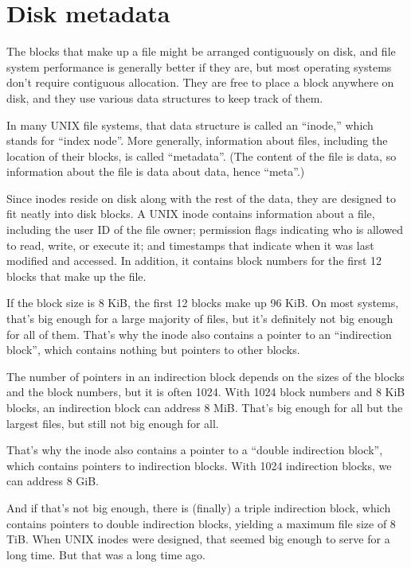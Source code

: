 \documentclass[12pt]{book}
\begin{document}
{\section{Disk metadata}

The blocks that make up a file might be arranged contiguously on
disk, and file system performance is generally better if they are,
but most operating systems don't require contiguous allocation.
They are free to place a block anywhere on disk, and they use
various data structures to keep track of them.

In many UNIX file systems, that data structure is called an ``inode,''
which stands for ``index node''.  More generally, information about
files, including the location of their blocks, is called ``metadata''.
(The content of the file is data, so information about the file is
data about data, hence ``meta''.)

Since inodes reside on disk along with the rest of the data, they are
designed to fit neatly into disk blocks.  A UNIX inode contains
information about a file, including the user ID of the file owner;
permission flags indicating who is allowed to read, write, or execute
it; and timestamps that indicate when it was last modified and
accessed.  In addition, it contains block numbers for the first 12
blocks that make up the file.

If the block size is 8 KiB, the first 12 blocks make up 96 KiB.
On most systems, that's big enough for a large majority of files,
but it's definitely not big enough for all of them.  That's
why the inode also contains a pointer to an ``indirection block'',
which contains nothing but pointers to other blocks.

The number of pointers in an indirection block depends on the sizes of
the blocks and the block numbers, but it is often 1024.  With 1024
block numbers and 8 KiB blocks, an indirection block can address 8
MiB.  That's big enough for all but the largest files, but still not
big enough for all.

That's why the inode also contains a pointer to a ``double indirection
block'', which contains pointers to indirection blocks.  With
1024 indirection blocks, we can address 8 GiB.

And if that's not big enough, there is (finally) a triple indirection
block, which contains pointers to double indirection blocks, yielding
a maximum file size of 8 TiB.  When UNIX inodes were designed, that
seemed big enough to serve for a long time.  But that was a long time
ago.

}
\end{document}
